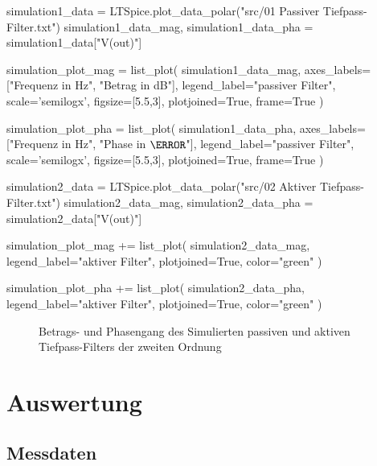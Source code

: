 \documentclass[a4paper]{hitec}
\begin{document}
\begin{sagesilent}
    simulation1_data = LTSpice.plot_data_polar("src/01 Passiver Tiefpass-Filter.txt")
    simulation1_data_mag, simulation1_data_pha = simulation1_data["V(out)"]

    simulation_plot_mag = list_plot(
        simulation1_data_mag,
        axes_labels=["Frequenz in Hz", "Betrag in dB"],
        legend_label="passiver Filter",
        scale='semilogx',
        figsize=[5.5,3],
        plotjoined=True,
        frame=True
    )

    simulation_plot_pha = list_plot(
        simulation1_data_pha,
        axes_labels=["Frequenz in Hz", "Phase in $\degree$"],
        legend_label="passiver Filter",
        scale='semilogx',
        figsize=[5.5,3],
        plotjoined=True,
        frame=True
    )

    simulation2_data = LTSpice.plot_data_polar("src/02 Aktiver Tiefpass-Filter.txt")
    simulation2_data_mag, simulation2_data_pha = simulation2_data["V(out)"]

    simulation_plot_mag += list_plot(
        simulation2_data_mag,
        legend_label="aktiver Filter",
        plotjoined=True,
        color="green"
    )

    simulation_plot_pha += list_plot(
        simulation2_data_pha,
        legend_label="aktiver Filter",
        plotjoined=True,
        color="green"
    )
\end{sagesilent}

\begin{figure}[H]
    \centering
    \begin{subfigure}{\textwidth}
        \centering
    \end{subfigure}
    \quad
    \begin{subfigure}{\textwidth}
        \centering
    \end{subfigure}
    \caption{Betrags- und Phasengang des Simulierten passiven und aktiven Tiefpass-Filters der zweiten Ordnung}
\end{figure}

\section{Auswertung}

\subsection{Messdaten}
\end{document}
